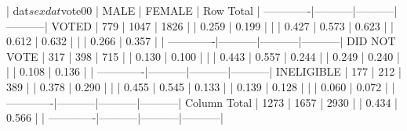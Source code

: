 \begin{Schunk}
\begin{Soutput}
             | dat$sex 
  dat$vote00 |      MALE |    FEMALE | Row Total | 
-------------|-----------|-----------|-----------|
       VOTED |       779 |      1047 |      1826 | 
             |     0.259 |     0.199 |           | 
             |     0.427 |     0.573 |     0.623 | 
             |     0.612 |     0.632 |           | 
             |     0.266 |     0.357 |           | 
-------------|-----------|-----------|-----------|
DID NOT VOTE |       317 |       398 |       715 | 
             |     0.130 |     0.100 |           | 
             |     0.443 |     0.557 |     0.244 | 
             |     0.249 |     0.240 |           | 
             |     0.108 |     0.136 |           | 
-------------|-----------|-----------|-----------|
  INELIGIBLE |       177 |       212 |       389 | 
             |     0.378 |     0.290 |           | 
             |     0.455 |     0.545 |     0.133 | 
             |     0.139 |     0.128 |           | 
             |     0.060 |     0.072 |           | 
-------------|-----------|-----------|-----------|
Column Total |      1273 |      1657 |      2930 | 
             |     0.434 |     0.566 |           | 
-------------|-----------|-----------|-----------|
\end{Soutput}
\end{Schunk}
